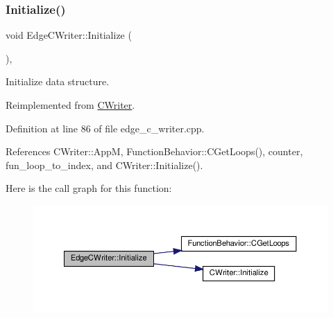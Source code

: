 \mbox{\label{classEdgeCWriter_a514808888307cd604ce3b453b550c6a3}} 
\subsubsection{\texorpdfstring{Initialize()}{Initialize()}}
{\footnotesize\ttfamily void Edge\+C\+Writer\+::\+Initialize (\begin{DoxyParamCaption}{ }\end{DoxyParamCaption})\hspace{0.3cm}{\ttfamily [override]}, {\ttfamily [virtual]}}



Initialize data structure. 



Reimplemented from \hyperlink{classCWriter_a7b57fdc8a06f368a65c03af147834198}{C\+Writer}.



Definition at line 86 of file edge\+\_\+c\+\_\+writer.\+cpp.



References C\+Writer\+::\+AppM, Function\+Behavior\+::\+C\+Get\+Loops(), counter, fun\+\_\+loop\+\_\+to\+\_\+index, and C\+Writer\+::\+Initialize().

Here is the call graph for this function\+:
\nopagebreak
\begin{figure}[H]
\begin{center}
\leavevmode
\includegraphics[width=350pt]{d7/dee/classEdgeCWriter_a514808888307cd604ce3b453b550c6a3_cgraph}
\end{center}
\end{figure}
\mbox{\label{classEdgeCWriter_afafb806eb259b1e582c4b4cd9abe201a}} 
